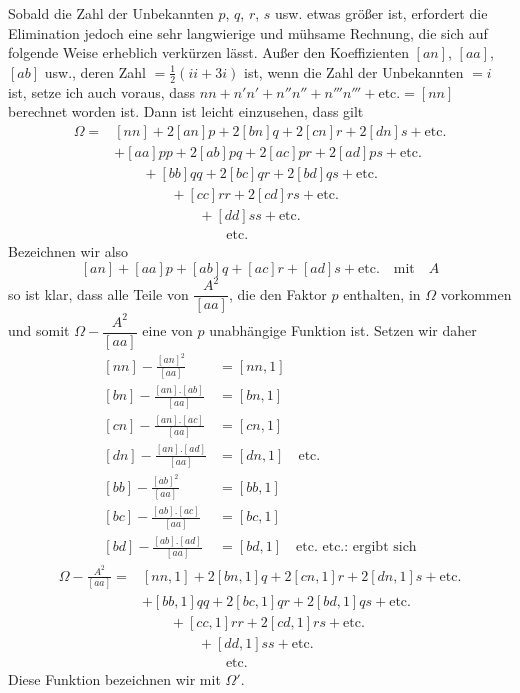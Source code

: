 Sobald die Zahl der Unbekannten $p$, $q$, $r$, $s$ usw. etwas größer ist, erfordert die Elimination jedoch eine sehr langwierige und mühsame Rechnung, die sich auf folgende Weise erheblich verkürzen lässt. Außer den Koeffizienten $[an]$, $[aa]$, $[ab]$ usw., deren Zahl $=\tfrac12(ii+3i)$ ist, wenn die Zahl der Unbekannten $=i$ ist, setze ich auch voraus, dass $nn+n'n'+n''n''+n'''n'''+\text{etc.}=[nn]$ berechnet worden ist. Dann ist leicht einzusehen, dass gilt
\[
\begin{aligned}
\Omega={}&[nn]+2[an]p+2[bn]q+2[cn]r+2[dn]s+\text{etc.}\\
&+[aa]pp+2[ab]pq+2[ac]pr+2[ad]ps+\text{etc.}\\
&\qquad+[bb]qq+2[bc]qr+2[bd]qs+\text{etc.}\\
&\qquad\qquad+[cc]rr+2[cd]rs+\text{etc.}\\
&\qquad\qquad\qquad+[dd]ss+\text{etc.}\\
&\qquad\qquad\qquad\qquad\text{etc.}
\end{aligned}
\]
Bezeichnen wir also
\[
{[an]}+[aa]p+[ab]q+[ac]r+[ad]s+\text{etc.}\quad\text{mit}\quad A
\]
so ist klar, dass alle Teile von $\dfrac{A^2}{[aa]}$, die den Faktor $p$ enthalten, in $\Omega$ vorkommen und somit $\Omega-\dfrac{A^2}{[aa]}$ eine von $p$ unabhängige Funktion ist. Setzen wir daher
\[
\begin{aligned}{}
{[nn]}-\frac{[an]^2}{[aa]}&=[nn,1]\\
{[bn]}-\frac{[an].[ab]}{[aa]}&=[bn,1]\\
{[cn]}-\frac{[an].[ac]}{[aa]}&=[cn,1]\\
{[dn]}-\frac{[an].[ad]}{[aa]}&=[dn,1]\quad\text{etc.}\\
{[bb]}-\frac{[ab]^2}{[aa]}&=[bb,1]\\
{[bc]}-\frac{[ab].[ac]}{[aa]}&=[bc,1]\\
{[bd]}-\frac{[ab].[ad]}{[aa]}&=[bd,1]\quad\text{etc. etc.: ergibt sich}
\end{aligned}
\]
\[
\begin{aligned}
\Omega-\frac{A^2}{[aa]}={}&[nn,1]+2[bn,1]q+2[cn,1]r+2[dn,1]s+\text{etc.}\\
&+[bb,1]qq+2[bc,1]qr+2[bd,1]qs+\text{etc.}\\
&\qquad+[cc,1]rr+2[cd,1]rs+\text{etc.}\\
&\qquad\qquad+[dd,1]ss+\text{etc.}\\
&\qquad\qquad\qquad\text{etc.}
\end{aligned}
\]
Diese Funktion bezeichnen wir mit $\Omega'$.

